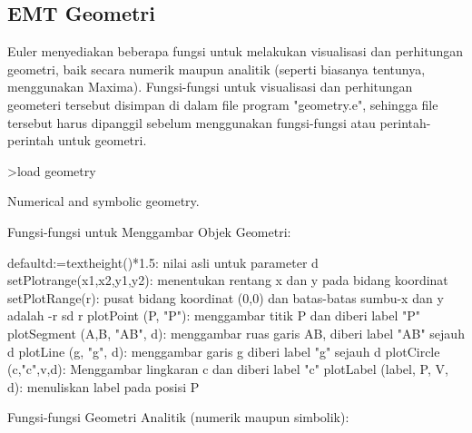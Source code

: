 \documentclass[12pt,Times new roman,letterpaper]{book}
\begin{document}
\begin{eulernootebook}
\begin{eulercomment}
\begin{eulercomment}
\begin{eulernootebook}
\begin{eulercomment}
\begin{eulercomment}
\begin{eulercomment}
\begin{eulercomment}
\begin{eulercomment}
\begin{eulercomment}
\chapter{EMT Geometri}
\begin{eulernotebook}
\begin{eulercomment}
\begin{eulercomment}
Euler menyediakan beberapa fungsi untuk melakukan visualisasi dan
perhitungan geometri, baik secara numerik maupun analitik (seperti
biasanya tentunya, menggunakan Maxima). Fungsi-fungsi untuk
visualisasi dan perhitungan geometeri tersebut disimpan di dalam file
program "geometry.e", sehingga file tersebut harus dipanggil sebelum
menggunakan fungsi-fungsi atau perintah-perintah untuk geometri.
\end{eulercomment}
\begin{eulerprompt}
>load geometry
\end{eulerprompt}
\begin{euleroutput}
  Numerical and symbolic geometry.
\end{euleroutput}
\begin{eulercomment}
Fungsi-fungsi untuk Menggambar Objek Geometri:

\end{eulercomment}
\begin{eulerttcomment}
  defaultd:=textheight()*1.5: nilai asli untuk parameter d
  setPlotrange(x1,x2,y1,y2): menentukan rentang x dan y pada bidang koordinat
  setPlotRange(r): pusat bidang koordinat (0,0) dan batas-batas sumbu-x dan y adalah -r sd r
  plotPoint (P, "P"): menggambar titik P dan diberi label "P"
  plotSegment (A,B, "AB", d): menggambar ruas garis AB, diberi label "AB" sejauh d
  plotLine (g, "g", d): menggambar garis g diberi label "g" sejauh d
  plotCircle (c,"c",v,d): Menggambar lingkaran c dan diberi label "c"
  plotLabel (label, P, V, d): menuliskan label pada posisi P
\end{eulerttcomment}
\begin{eulercomment}

Fungsi-fungsi Geometri Analitik (numerik maupun simbolik):


\end{eulercomment}
\end{eulercomment}
\end{eulernotebook}
\end{eulercomment}
\end{eulercomment}
\end{eulercomment}
\end{eulercomment}
\end{eulercomment}
\end{eulercomment}
\end{eulernootebook}
\end{eulercomment}
\end{eulercomment}
\end{eulernootebook}
\end{document}
